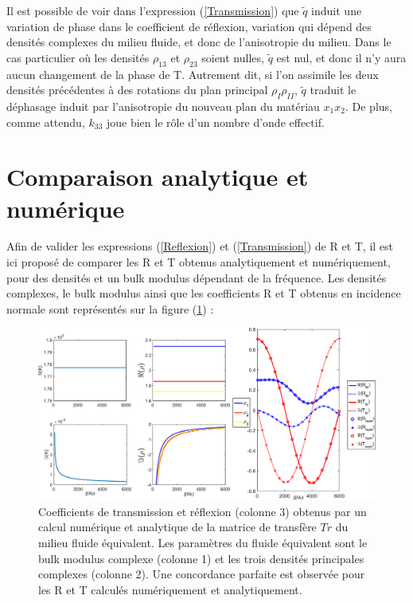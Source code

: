 \documentclass[12pt]{report}
\begin{document}
    Il est possible de voir dans l'expression (\ref{Transmission}) que $\tilde{q}$ induit une variation de phase dans le coefficient de réflexion, variation qui dépend des densités complexes du milieu fluide, et donc de l'anisotropie du milieu. Dans le cas particulier où les densités $\rho_{13}$ et $\rho_{23}$ soient nulles, $\tilde{q}$ est nul, et donc il n'y aura aucun changement de la phase de T. Autrement dit, si l'on assimile les deux densités précédentes à des rotations du plan principal $\rho_I\rho_{II}$, $\tilde{q}$ traduit le déphasage induit par l'anisotropie du nouveau plan du matériau $x_1x_2$. De plus, comme attendu, $k_{33}$ joue bien le rôle d'un nombre d'onde effectif.
    
\section{Comparaison analytique et numérique}
\label{Ch_Dir_S_Comp}
    Afin de valider les expressions (\ref{Reflexion}) et (\ref{Transmission}) de R et T, il est ici proposé de comparer les R et T obtenus analytiquement et numériquement, pour des densités et un bulk modulus dépendant de la fréquence. Les densités complexes, le bulk modulus ainsi que les coefficients R et T obtenus en incidence normale sont représentés sur la figure (\ref{RT_comp}) :
\begin{figure}[ht!]
    \centering
    \includegraphics[scale=0.4]{RT_num_th.pdf}
    \caption{ Coefficients de transmission et réflexion (colonne 3) obtenus par un calcul numérique et analytique de la matrice de transfère $Tr$ du milieu fluide équivalent. Les paramètres du fluide équivalent sont le bulk modulus complexe (colonne 1) et les trois densités principales complexes (colonne 2). Une concordance parfaite est observée pour les R et T calculés numériquement et analytiquement.}
    \label{RT_comp}
\end{figure}
    
\end{document}
